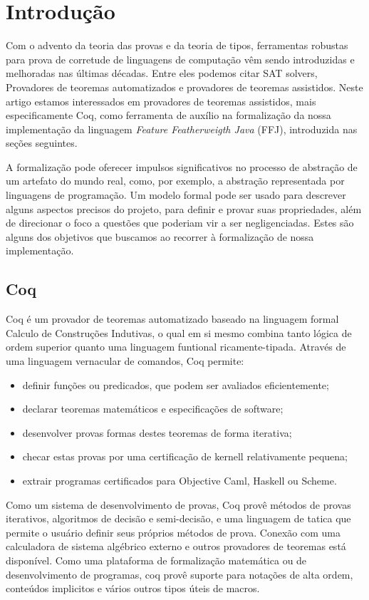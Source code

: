 \chapter{Introdução}
Com o advento da teoria das provas e da teoria de tipos\cite{martinlof}, ferramentas robustas para prova de corretude de linguagens de computação vêm sendo introduzidas e melhoradas nas últimas décadas. Entre eles podemos citar SAT solvers, Provadores de teoremas automatizados e provadores de teoremas assistidos.
Neste artigo estamos interessados em provadores de teoremas assistidos, mais especificamente 
Coq, como ferramenta de auxílio na formalização da nossa implementação da linguagem 
\textit{Feature Featherweigth Java} (FFJ), introduzida nas seções seguintes. 

A formalização pode oferecer impulsos significativos no processo de abstração de um artefato
do mundo real, como, por exemplo, a abstração representada por linguagens de programação. 
Um modelo formal pode ser usado 
para descrever alguns aspectos precisos do projeto, para definir e provar suas propriedades, 
além de direcionar o foco a questões que poderiam vir a ser negligenciadas. 
Estes são alguns dos objetivos que buscamos ao recorrer à formalização de nossa implementação.

	\section{Coq}
	Coq é um provador de teoremas automatizado  baseado na linguagem formal Calculo de Construções Indutivas\cite{coqart}, o qual em si mesmo combina tanto lógica de ordem superior quanto uma linguagem funtional ricamente-tipada. Através de uma linguagem vernacular de comandos, Coq permite:
	\begin{itemize}
		\item definir funções ou predicados, que podem ser avaliados eficientemente;
		\item declarar teoremas matemáticos e especificações de software;
		\item desenvolver provas formas destes teoremas de forma iterativa;
		\item checar estas provas por uma certificação de kernell relativamente pequena;
		\item extrair programas certificados para Objective Caml, Haskell ou Scheme.
	\end{itemize}
	Como um sistema de desenvolvimento de provas, Coq provê métodos de provas iterativos, algoritmos de decisão e semi-decisão, e uma linguagem de tatica que permite o usuário definir seus próprios métodos de prova. Conexão com uma calculadora de sistema algébrico externo e outros provadores de teoremas está disponível.
	Como uma plataforma de formalização matemática ou de desenvolvimento de programas, coq provê suporte para notações de alta ordem, conteúdos implicitos e vários outros tipos úteis de macros.


